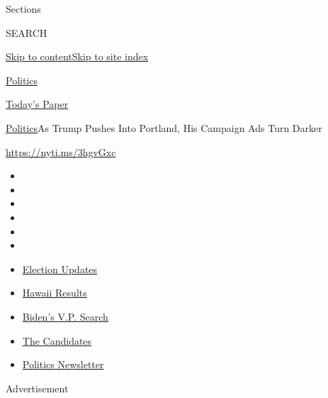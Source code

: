 Sections

SEARCH

\protect\hyperlink{site-content}{Skip to
content}\protect\hyperlink{site-index}{Skip to site index}

\href{https://www.nytimes.com/section/politics}{Politics}

\href{https://myaccount.nytimes.com/auth/login?response_type=cookie\&client_id=vi}{}

\href{https://www.nytimes.com/section/todayspaper}{Today's Paper}

\href{/section/politics}{Politics}\textbar{}As Trump Pushes Into
Portland, His Campaign Ads Turn Darker

\href{https://nyti.ms/3hgvGxc}{https://nyti.ms/3hgvGxc}

\begin{itemize}
\item
\item
\item
\item
\item
\item
\end{itemize}

\begin{itemize}
\item
  \href{https://www.nytimes.com/2020/08/07/us/elections/biden-vs-trump.html?action=click\&pgtype=Article\&state=default\&region=TOP_BANNER\&context=storylines_menu}{Election
  Updates}
\item
  \href{https://www.nytimes.com/interactive/2020/08/08/us/elections/results-hawaii-primary-elections.html?action=click\&pgtype=Article\&state=default\&region=TOP_BANNER\&context=storylines_menu}{Hawaii
  Results}
\item
  \href{https://www.nytimes.com/article/biden-vice-president-2020.html?action=click\&pgtype=Article\&state=default\&region=TOP_BANNER\&context=storylines_menu}{Biden's
  V.P. Search}
\item
  \href{https://www.nytimes.com/interactive/2019/us/politics/2020-presidential-candidates.html?action=click\&pgtype=Article\&state=default\&region=TOP_BANNER\&context=storylines_menu}{The
  Candidates}
\item
  \href{https://www.nytimes.com/newsletters/politics?action=click\&pgtype=Article\&state=default\&region=TOP_BANNER\&context=storylines_menu}{Politics
  Newsletter}
\end{itemize}

Advertisement

